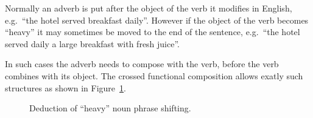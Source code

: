 \begin{example}
Normally an adverb is put after the object of the verb it modifies in English, e.g.\ ``the hotel served breakfast daily''. However if the object of the verb becomes ``heavy'' it may sometimes be moved to the end of the sentence, e.g.\ ``the hotel served daily a large breakfast with fresh juice''.


In such cases the adverb needs to compose with the verb, before the verb combines with its object. The crossed functional composition allows exatly such structures as shown in Figure~\ref{fig:semantics}.

\begin{figure}[ht]
\center
{}
\caption{Deduction of ``heavy'' noun phrase shifting.}
\label{fig:semantics}
\end{figure}
\label{ex:semantics}
\end{example}
\done

